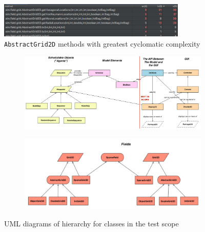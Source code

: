 \documentclass[11pt]{article}
\begin{document}
\begin{figure}[htp]
\centering
\includegraphics[width=0.8\textwidth]{Appendix/method_complexity}
\caption{\texttt{AbstractGrid2D} methods with greatest cyclomatic complexity}
\label{fig:method_complexity}
\end{figure}

\begin{figure}[htp]
\begin{subfigure}[b]{\textwidth}
\includegraphics[width=\textwidth]{Appendix/UML}
\end{subfigure}
\begin{subfigure}[b]{\textwidth}
\includegraphics[width=\textwidth]{Appendix/UML_fields}
\end{subfigure}
\caption{UML diagrams of hierarchy for classes in the test scope\cite{mason_uml}}
\label{fig:uml}
\end{figure}
\end{document}

